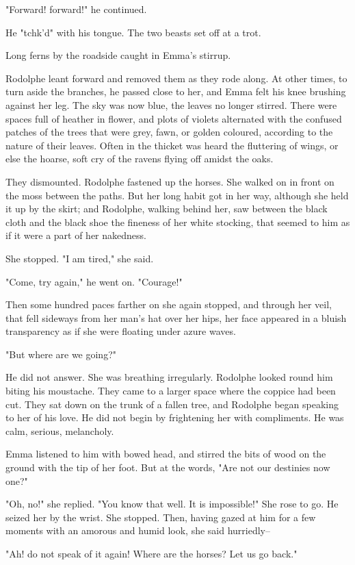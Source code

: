 \documentclass[11pt,twocolumn]{ltugboat}
\begin{document}
"Forward! forward!" he continued.

He "tchk'd" with his tongue. The two beasts set off at a trot.

Long ferns by the roadside caught in Emma's stirrup.

Rodolphe leant forward and removed them as they rode along. At other
times, to turn aside the branches, he passed close to her, and Emma felt
his knee brushing against her leg. The sky was now blue, the leaves no
longer stirred. There were spaces full of heather in flower, and plots
of violets alternated with the confused patches of the trees that were
grey, fawn, or golden coloured, according to the nature of their leaves.
Often in the thicket was heard the fluttering of wings, or else the
hoarse, soft cry of the ravens flying off amidst the oaks.

They dismounted. Rodolphe fastened up the horses. She walked on in
front on the moss between the paths. But her long habit got in her way,
although she held it up by the skirt; and Rodolphe, walking behind her,
saw between the black cloth and the black shoe the fineness of her white
stocking, that seemed to him as if it were a part of her nakedness.

She stopped. "I am tired," she said.

"Come, try again," he went on. "Courage!"

Then some hundred paces farther on she again stopped, and through her
veil, that fell sideways from her man's hat over her hips, her face
appeared in a bluish transparency as if she were floating under azure
waves.

"But where are we going?"

He did not answer. She was breathing irregularly. Rodolphe looked round
him biting his moustache. They came to a larger space where the coppice
had been cut. They sat down on the trunk of a fallen tree, and Rodolphe
began speaking to her of his love. He did not begin by frightening her
with compliments. He was calm, serious, melancholy.

Emma listened to him with bowed head, and stirred the bits of wood on
the ground with the tip of her foot. But at the words, "Are not our
destinies now one?"

"Oh, no!" she replied. "You know that well. It is impossible!" She rose
to go. He seized her by the wrist. She stopped. Then, having gazed
at him for a few moments with an amorous and humid look, she said
hurriedly--

"Ah! do not speak of it again! Where are the horses? Let us go back."
\end{document}

